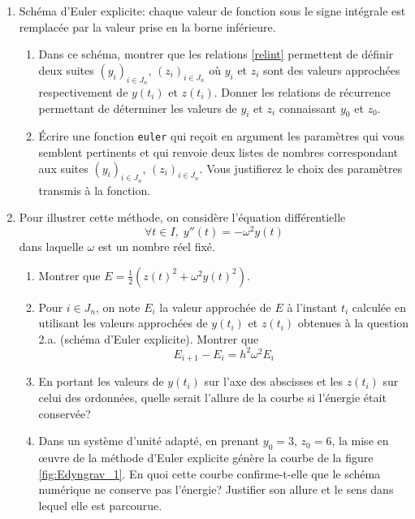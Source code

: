 \begin{enumerate}
\item Schéma d'Euler explicite: chaque valeur de fonction sous le signe intégrale est remplacée par la valeur prise en la borne inférieure.
\begin{enumerate}
  \item Dans ce schéma, montrer que les relations \ref{relint} permettent de définir deux suites $\left(y_i \right)_{i\in J_n}$, $\left(z_i \right)_{i\in J_n}$ où $y_i$ et $z_i$ sont des valeurs approchées respectivement de $y(t_i)$ et $z(t_i)$. Donner les relations de récurrence permettant de déterminer les valeurs de $y_i$ et $z_i$ connaissant $y_0$ et $z_0$.
  \item \'Ecrire une fonction \texttt{euler} qui reçoit en argument les paramètres qui vous semblent pertinents et qui renvoie deux listes de nombres correspondant aux suites $\left(y_i \right)_{i\in J_n}$, $\left(z_i \right)_{i\in J_n}$. Vous justifierez le choix des paramètres transmis à la fonction.
\end{enumerate}

\item Pour illustrer cette méthode, on considère l'équation différentielle
\begin{displaymath}
  \forall t\in I,\; y''(t) = -\omega^2 y(t)
\end{displaymath}
dans laquelle $\omega$ est un nombre réel fixé.
\begin{enumerate}
  \item Montrer que $E=\frac{1}{2}\left( z(t)^2 + \omega^2 y(t)^2\right) $.
  \item Pour $i\in J_n$, on note $E_i$ la valeur approchée de $E$ à l'instant $t_i$ calculée en utilisant les valeurs approchées de $y(t_i)$ et $z(t_i)$ obtenues à la question 2.a. (schéma d'Euler explicite). Montrer que 
\begin{displaymath}
  E_{i+1} - E_i = h^2 \omega^2 E_i
\end{displaymath}
  \item En portant les valeurs de $y(t_i)$ sur l'axe des abscisses et les $z(t_i)$ sur celui des ordonnées, quelle serait l'allure de la courbe si l'énergie était conservée?
  \item Dans un système d'unité adapté,\label{misenoev} en prenant $y_0=3$, $z_0=6$, la mise en \oe{}uvre de la méthode d'Euler explicite génère la courbe de la figure \ref{fig:Edyngrav_1}. En quoi cette courbe confirme-t-elle que le schéma numérique ne conserve pas l'énergie? Justifier son allure et le sens dans lequel elle est parcourue.
\end{enumerate}


\end{enumerate}
